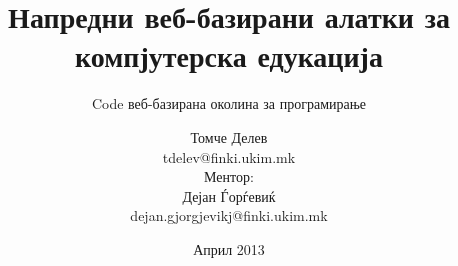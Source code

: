 

\author[T. Delev \and D. Gjorgjevikj]{Томче
Делев\\tdelev@finki.ukim.mk\\Ментор:\\ Дејан
Ѓорѓевиќ\\dejan.gjorgjevikj@finki.ukim.mk}
\title[code.finki.ukim.mk]{Напредни веб-базирани алатки за компјутерска едукација}
\subtitle{Code веб-базирана околина за програмирање}
\date{Април 2013}




\frame[t,plain]{\titlepage}






